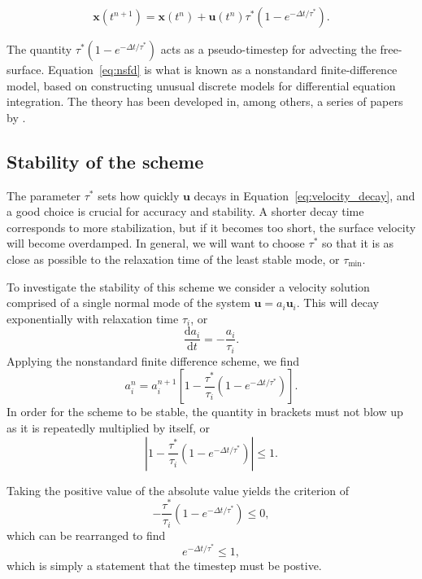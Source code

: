 \documentclass[preprint,12pt,authoryear]{elsarticle}
\newif\ifdetail
\begin{document}
\begin{equation}
\mathbf{x}(t^{n+1}) = \mathbf{x}(t^n) + \mathbf{u}(t^{n}) \tau^* \left(1-e^{-\Delta t/\tau^*} \right).
\label{eq:nsfd}
\end{equation}

The quantity $\tau^*(1-e^{-\Delta t / \tau^*})$ acts as a pseudo-timestep for advecting the free-surface.
Equation~\eqref{eq:nsfd} is what is known as a nonstandard finite-difference model, based on
constructing unusual discrete models for differential equation integration.
The theory has been developed in, among others, a series of papers by
\citet{mickens1994nonstandard, mickens2002nonstandard, mickens2005dynamic}.

\subsection{Stability of the scheme}
The parameter $\tau^*$ sets how quickly $\mathbf{u}$ decays in Equation~\eqref{eq:velocity_decay}, and a good 
choice is crucial for accuracy and stability. A shorter decay time corresponds to more stabilization,
but if it becomes too short, the surface velocity will become overdamped. In general, we will want 
to choose $\tau^*$ so that it is as close as possible to the relaxation time of the least stable mode, or $\tau_{\mathrm{min}}$.

To investigate the stability of this scheme we consider a velocity solution comprised of 
a single normal mode of the system $\mathbf{u} = a_i \mathbf{u}_i$.
This will decay exponentially with relaxation time $\tau_i$, or
\begin{equation}
\frac{\text{d} a_i} {\text{d}t} = - \frac{ a_i }{\tau_i}.
\end{equation}
Applying the nonstandard finite difference scheme, we find
\begin{equation}
a_i^{n} = a_i^{n+1} \left[ 1 - \frac{\tau^*}{\tau_i} \left(1-e^{-\Delta t/\tau^*} \right) \right].
\label{eq:recursion}
\end{equation}
In order for the scheme to be stable, the quantity in brackets must not blow up as it is repeatedly multiplied by itself, or 
\begin{equation}
\left| 1 - \frac{\tau^*}{\tau_i} \left(1-e^{-\Delta t/\tau^*} \right) \right| \le 1.
\end{equation}

\ifdetail
Taking the positive value of the absolute value yields the criterion of 
\begin{equation}
- \frac{\tau^*}{\tau_i} \left(1-e^{-\Delta t/\tau^*} \right) \le 0,
\end{equation}
which can be rearranged to find
\begin{equation}
e^{-\Delta t/\tau^*} \le 1,
\end{equation}
which is simply a statement that the timestep must be postive.
\end{document}
